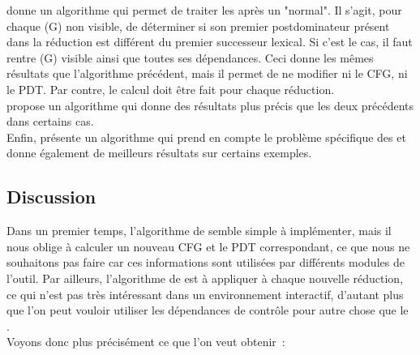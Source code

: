 \cite{agrawal94slicing} donne un algorithme qui permet de traiter
les  après un \slicing{} "normal".
Il s'agit, pour chaque  (G) non visible,
de déterminer si son premier postdominateur
présent dans la réduction est différent du premier successeur lexical.
Si c'est le cas, il faut rentre (G) visible ainsi que toutes ses dépendances.
Ceci donne les mêmes résultats que l'algorithme précédent,
mais il permet de ne modifier ni le CFG, ni le PDT.
Par contre, le calcul doit être fait pour chaque réduction.\\

\cite{harman98new} propose un algorithme qui donne des résultats
plus précis que les deux précédents dans certains cas.\\

Enfin, \cite{kumar02better} présente un algorithme qui prend
en compte le problème spécifique des  et donne
également de meilleurs résultats sur certains exemples.

\subsection{Discussion}\label{sec-dpdc-goto}

Dans un premier temps, l'algorithme de \cite{Choi94} semble simple à
implémenter, mais il nous oblige à calculer un nouveau CFG et le PDT
correspondant, ce que nous ne souhaitons pas faire car ces informations sont
utilisées par différents modules de l'outil.
Par ailleurs, l'algorithme de \cite{agrawal94slicing}
est à appliquer à chaque nouvelle réduction, ce qui n'est pas très intéressant
dans un environnement interactif, d'autant plus que l'on peut vouloir utiliser
les dépendances de contrôle pour autre chose que le \slicing.\\

Voyons donc plus précisément ce que l'on veut obtenir~:


